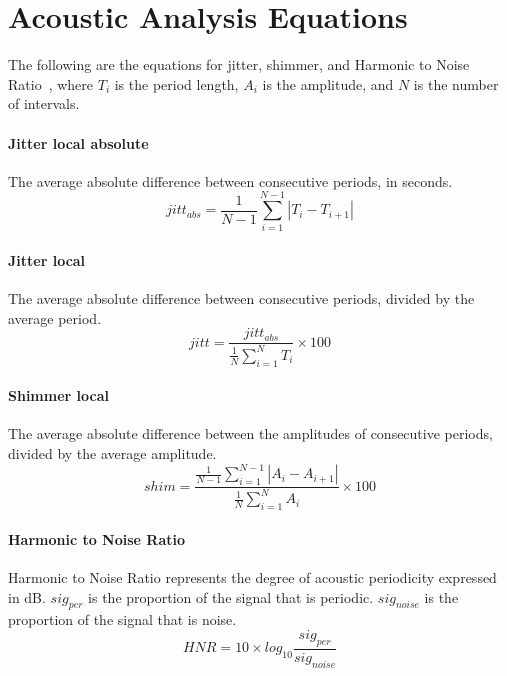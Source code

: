 \documentclass[10pt, journal, anonymous=true]{IEEEtran}
\begin{document}
\section{Acoustic Analysis Equations} \label{sec:meth:equations}

The following are the equations for jitter,
 shimmer, and Harmonic to Noise Ratio~\cite{teixeira_vocal_2013, praat_manual}, where $T_{i}$ is the period length, $A_{i}$ is the amplitude, and $N$ is the number of intervals. 


\paragraph{Jitter local absolute}
The average absolute difference between consecutive 
periods, in seconds.
\begin{equation} \label{eq:jitt_abs}
    jitt_{abs}=\frac{1}{N-1}\sum_{i=1}^{N-1}\left | T_{i} - T_{i+1} \right |  
\end{equation}


\paragraph{Jitter local}
The average absolute difference between 
consecutive periods, divided by the average period.
\begin{equation} \label{eq:jitt_local}
    jitt = \frac{jitt_{abs}}{\frac{1}{N}\sum\limits_{i=1}^{N}T_{i}}\times 100
\end{equation}

\paragraph{Shimmer local}
The average absolute difference between the amplitudes 
of consecutive periods, divided by the average amplitude.
\begin{equation} \label{eq:shim_local}
    shim=\frac{\frac{1}{N-1}\sum\limits_{i=1}^{N-1}\left | A_{i}-A_{i+1} \right |}{\frac{1}{N}\sum\limits_{i=1}^{N}A_{i}}\times 100
\end{equation}

\paragraph{Harmonic to Noise Ratio}
Harmonic to Noise Ratio represents the degree 
of acoustic periodicity expressed in dB. 
$sig_{per}$ is the proportion of the signal that
is periodic. $sig_{noise}$ is the proportion of
the signal that is noise.
\begin{equation} \label{eq:hnr}
    HNR = 10 \times log_{10}\frac{sig_{per}}{sig_{noise}}
\end{equation}
\hfill
\end{document}
